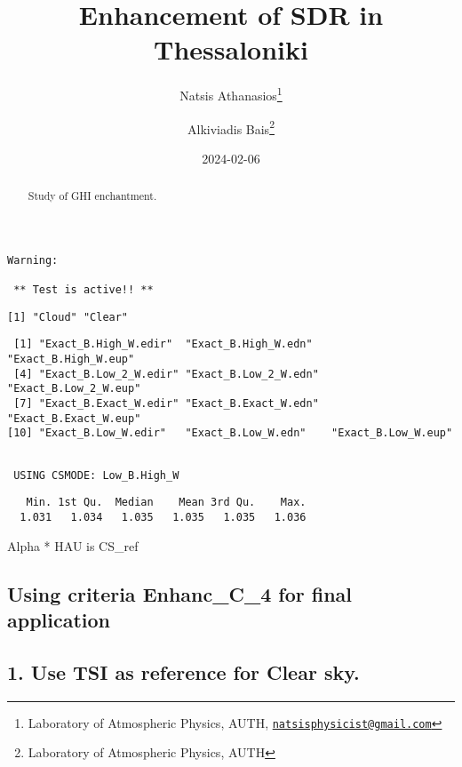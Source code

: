 \documentclass[
  10pt,
  a4paper,oneside]{article}
\title{Enhancement of SDR in Thessaloniki}
\author{Natsis Athanasios\footnote{Laboratory of Atmospheric Physics, AUTH, \href{mailto:natsisphysicist@gmail.com}{\nolinkurl{natsisphysicist@gmail.com}}} \and Alkiviadis Bais\footnote{Laboratory of Atmospheric Physics, AUTH}}
\date{2024-02-06}
\begin{document}
\maketitle
\begin{abstract}
Study of GHI enchantment.
\end{abstract}

{
\hypersetup{linkcolor=}
\setcounter{tocdepth}{4}
\tableofcontents
}
\begin{verbatim}
Warning: 

 ** Test is active!! ** 
\end{verbatim}

\begin{verbatim}
[1] "Cloud" "Clear"
\end{verbatim}

\begin{verbatim}
 [1] "Exact_B.High_W.edir"  "Exact_B.High_W.edn"   "Exact_B.High_W.eup"  
 [4] "Exact_B.Low_2_W.edir" "Exact_B.Low_2_W.edn"  "Exact_B.Low_2_W.eup" 
 [7] "Exact_B.Exact_W.edir" "Exact_B.Exact_W.edn"  "Exact_B.Exact_W.eup" 
[10] "Exact_B.Low_W.edir"   "Exact_B.Low_W.edn"    "Exact_B.Low_W.eup"   
\end{verbatim}

\begin{verbatim}

 USING CSMODE: Low_B.High_W 
\end{verbatim}

\begin{verbatim}
   Min. 1st Qu.  Median    Mean 3rd Qu.    Max. 
  1.031   1.034   1.035   1.035   1.035   1.036 
\end{verbatim}

Alpha * HAU is CS\_ref

\hypertarget{using-criteria-enhanc_c_4-for-final-application}{%
\subsection{\texorpdfstring{Using criteria \textbf{Enhanc\_C\_4} for final application}{Using criteria Enhanc\_C\_4 for final application}}\label{using-criteria-enhanc_c_4-for-final-application}}

\hypertarget{use-tsi-as-reference-for-clear-sky.}{%
\subsection{1. Use TSI as reference for Clear sky.}\label{use-tsi-as-reference-for-clear-sky.}}
\end{document}
